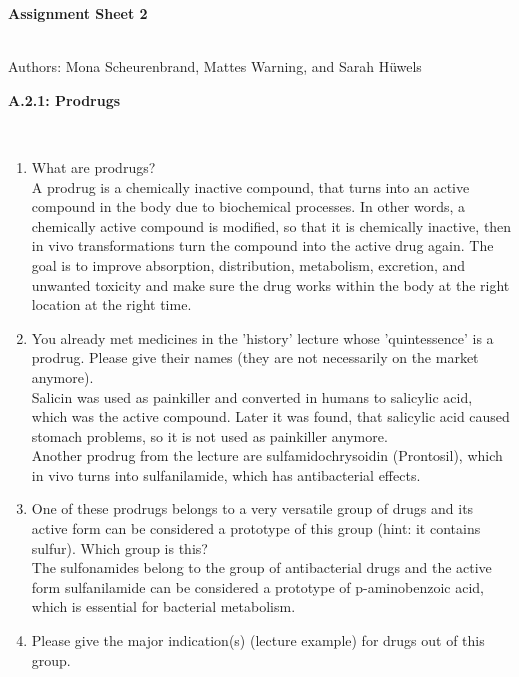 \documentclass[a4paper,10pt]{article}
\begin{document}


\begin{huge}
	\vspace{1cm}
	\textbf{Assignment Sheet 2}
\end{huge} \\

Authors: Mona Scheurenbrand, Mattes Warning, and Sarah Hüwels


\begin{large}
	\vspace{1.0cm}
	\textbf{A.2.1: Prodrugs}
\end{large}	\\ [2mm]
\begin{enumerate}
    \item What are prodrugs? \\
    A prodrug is a chemically inactive compound, that turns into an active compound in the body due to biochemical processes. In other words, a chemically active compound is modified, so that it is chemically inactive, then in vivo transformations turn the compound into the active drug again. \cite{Zawilska2013}
    The goal is to improve absorption, distribution, metabolism, excretion, and unwanted toxicity and make sure the drug works within the body at the right location at the right time. \cite{Zawilska2013}
    \item You already met medicines in the ’history’ lecture whose ’quintessence’ is a prodrug. Please give their names (they are not necessarily on the market anymore). \\
    Salicin was used as painkiller and converted in humans to salicylic acid, which was the active compound. Later it was found, that salicylic acid caused stomach problems, so it is not used as painkiller anymore.  \\
    Another prodrug from the lecture are sulfamidochrysoidin (Prontosil), which in vivo turns into sulfanilamide, which has antibacterial effects.
    \item One of these prodrugs belongs to a very versatile group of drugs and its active form can be considered a prototype of this group (hint: it contains sulfur). Which group is this? \\
    The sulfonamides belong to the group of antibacterial drugs and the active form sulfanilamide can be considered a prototype of p-aminobenzoic acid, which is essential for bacterial metabolism. 
    \item Please give the major indication(s) (lecture example) for drugs out of this group. \\

\end{enumerate}
\end{document}
